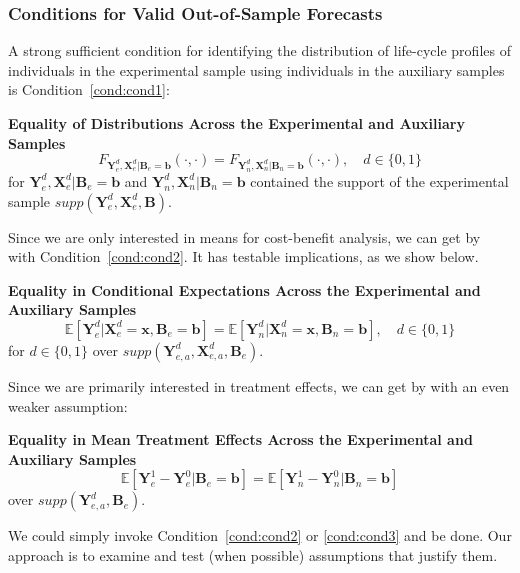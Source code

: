 \subsubsection{Conditions for Valid Out-of-Sample Forecasts}

A strong sufficient condition for identifying the distribution of life-cycle profiles of individuals in the experimental sample using individuals in the auxiliary samples is Condition~\ref{cond:cond1}:

\onehalfspacing
\begin{condition} \textbf{Equality of Distributions Across the Experimental and Auxiliary Samples \label{cond:cond1}}
\begin{equation}
F_{\bm{Y}_e^d, \bm{X}_e^d | \bm{B}_e = \bm{b}} \left( \cdot, \cdot \right) = F_{\bm{Y}_n^d, \bm{X}_n^d | \bm{B}_n = \bm{b}} \left( \cdot, \cdot \right), \quad d \in \{0,1\}
\end{equation}
\noindent for $\bm{Y}_e^d, \bm{X}^d_e | \bm{B}_e = \bm{b}$ and $\bm{Y}_n^d, \bm{X}^d_n | \bm{B}_n = \bm{b}$ contained the support of the experimental sample $supp\left(\bm{Y}^d_{e}, \bm{X}^d_{e}, \bm{B}\right)$.
\end{condition}
\doublespacing

Since we are only interested in means for cost-benefit analysis, we can get by with Condition~\ref{cond:cond2}. It has testable implications, as we show below.

\onehalfspacing
\begin{condition} \textbf{Equality in Conditional Expectations Across the Experimental and Auxiliary Samples \label{cond:cond2}}
\begin{equation}
\mathbb{E} \left[ \bm{Y}_e^d |  \bm{X}_e^d = \bm{x}, \bm{B}_e = \bm{b} \right] = \mathbb{E} \left[ \bm{Y}_n^d |  \bm{X}_n^d = \bm{x}, \bm{B}_n = \bm{b} \right], \quad d \in \{0,1\}
\end{equation}
for $d \in \{0, 1 \}$ over $supp\left(\bm{Y}^d_{e,a}, \bm{X}^d_{e,a}, \bm{B}_e\right)$.
\end{condition}
\doublespacing

Since we are primarily interested in treatment effects, we can get by with an even weaker assumption:

\onehalfspacing
\begin{condition} \textbf{Equality in Mean Treatment Effects Across the Experimental and Auxiliary Samples \label{cond:cond3}}
\begin{equation}
\mathbb{E} \left[ \bm{Y}_e^1 - \bm{Y}_e^0 | \bm{B}_e = \bm{b} \right] = \mathbb{E} \left[ \bm{Y}_n^1 - \bm{Y}_n^0 | \bm{B}_n = \bm{b} \right]
\end{equation}
over $supp\left(\bm{Y}^d_{e,a}, \bm{B}_e\right)$.
\end{condition}
\doublespacing
We could simply invoke Condition~\ref{cond:cond2} or \ref{cond:cond3} and be done. Our approach is to examine and test (when possible) assumptions that justify them. 

